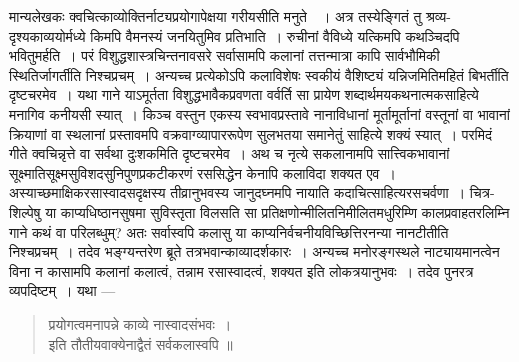 {\dev मान्यलेखकः क्वचित्काव्योक्तिर्नाट्यप्रयोगापेक्षया गरीयसीति मनुते}~{\dev~। अत्र तस्येङ्गितं तु श्रव्य-दृश्यकाव्ययोर्मध्ये किमपि वैमनस्यं जनयितुमिव प्रतिभाति~। रुचीनां वैविध्ये यत्किमपि कथञ्चिदपि भवितुमर्हति~। परं विशुद्धशास्त्रचिन्तनावसरे सर्वासामपि कलानां तत्तन्मात्रा कापि सार्वभौमिकी स्थितिर्जागर्तीति निश्चप्रचम्~। अन्यच्च प्रत्येकोऽपि कलाविशेषः स्वकीयं वैशिष्ट्यं यन्निजमितिमहितं बिभर्तीति दृष्टचरमेव~। यथा गाने याऽमूर्तता  विशुद्धभावैकप्रवणता वर्वर्ति सा प्रायेण शब्दार्थमयकथनात्मकसाहित्ये मनागिव कनीयसी स्यात्~। किञ्च वस्तुन एकस्य स्वभावप्रस्तावे नानाविधानां मूर्तामूर्तानां वस्तूनां वा भावानां क्रियाणां वा स्थलानां प्रस्तावमपि वक्रवाग्व्यापाररूपेण सुलभतया समानेतुं साहित्ये शक्यं स्यात्~। परमिदं गीते क्वचिन्नृत्ते वा सर्वथा दुःशकमिति दृष्टचरमेव~। अथ च नृत्ये सकलानामपि सात्त्विकभावानां सूक्ष्मातिसूक्ष्मसुविशदसुनिपुणप्रकटीकरणं रससिद्धेन केनापि कलाविदा शक्यत एव~। अस्याच्छमाक्षिकरसास्वादसदृक्षस्य तीव्रानुभवस्य जानुदघ्नमपि नायाति कदाचित्साहित्यरसचर्वणा~। चित्र-शिल्पेषु या काप्यधिष्ठानसुषमा सुविस्तृता विलसति सा प्रतिक्षणोन्मीलितनिमीलितमधुरिम्णि कालप्रवाहतरलिम्नि गाने कथं वा परिलब्धुम्? अतः सर्वास्वपि कलासु या काप्यनिर्वचनीयविच्छित्तिरनन्या नानटीतीति निश्चप्रचम्~। तदेव भङ्ग्यन्तरेण ब्रूते तत्रभवान्काव्यादर्शकारः~। अन्यच्च मनोरङ्गस्थले नाट्यायमानत्वेन विना न कासामपि कलानां कलात्वं, तन्नाम रसास्वादत्वं, शक्यत इति लोकत्रयानुभवः~। तदेव पुनरत्र व्यपदिष्टम्~। यथा ---} 
\begin{quote}
{\dev प्रयोगत्वमनापन्ने काव्ये नास्वादसंभवः~।}\\
{\dev इति तौतीयवाक्येनाद्वैतं सर्वकलास्वपि ॥}
\end{quote}

